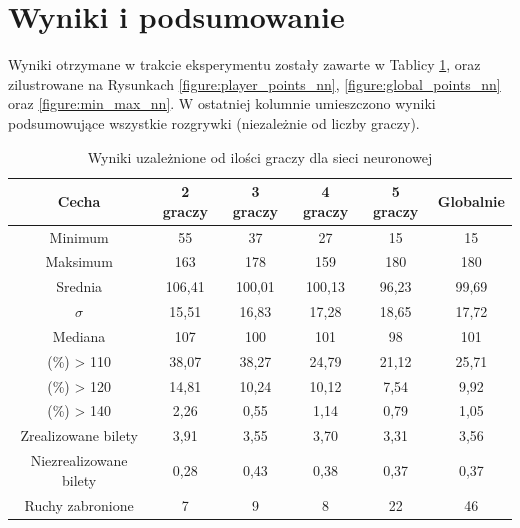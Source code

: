 \documentclass[12pt, oneside]{report}
\begin{document}
	\section{Wyniki i podsumowanie} 
	Wyniki otrzymane w trakcie eksperymentu zostały zawarte w Tablicy \ref{table:nn_sizeresult}, oraz zilustrowane na Rysunkach \ref{figure:player_points_nn}, \ref{figure:global_points_nn} oraz \ref{figure:min_max_nn}.
	W ostatniej kolumnie umieszczono wyniki podsumowujące wszystkie rozgrywki (niezależnie od liczby graczy).
	
	\begin{table}[h]
		\begin{center}
			\begin{tabular}{| c | c | c | c | c | c |} \hline
				Cecha & 2 graczy & 3 graczy & 4 graczy & 5 graczy & Globalnie \\ \hline
				Minimum & 55 & 37 & 27 & 15 & 15 \\ \hline
				Maksimum & 163 & 178 & 159 & 180 & 180 \\ \hline
				Srednia & 106,41 & 100,01 & 100,13 & 96,23 & 99,69 \\ \hline
				\begin{math}\sigma\end{math} & 15,51 & 16,83 & 17,28 & 18,65 & 17,72 \\ \hline 
				Mediana & 107 & 100 & 101 & 98 & 101 \\ \hline
				(\%) > 110 & 38,07 & 38,27 & 24,79 & 21,12 & 25,71 \\ \hline
				(\%) > 120 & 14,81 & 10,24 & 10,12 & 7,54 & 9,92 \\ \hline
				(\%) > 140 & 2,26 & 0,55 & 1,14 & 0,79 & 1,05 \\ \hline
				Zrealizowane bilety & 3,91 & 3,55 & 3,70 & 3,31 & 3,56 \\ \hline
				Niezrealizowane bilety & 0,28 & 0,43 & 0,38 & 0,37 & 0,37 \\ \hline
				Ruchy zabronione & 7&9&8&22&46 \\ \hline
			\end{tabular}
			\caption{Wyniki uzależnione od ilości graczy dla sieci neuronowej}
			\label{table:nn_sizeresult}
		\end{center}
	\end{table}
	
\end{document}
